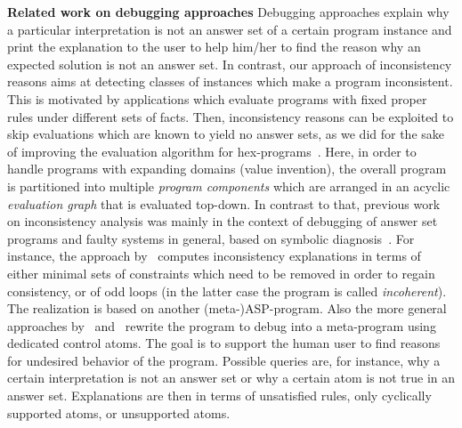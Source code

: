 \documentclass[11pt,fleqn,twoside]{article}
\newcommand{\leanparagraph}[1]{\smallskip\noindent\textbf{#1}}
\newcommand\hex{{\sc hex}\xspace}
\begin{document}
		\leanparagraph{Related work on debugging approaches}
		Debugging approaches explain why a particular interpretation is not an answer set of a certain program instance
		and print the explanation to the user to help him/her to find the reason why an expected solution is not an answer set.
		In contrast, our approach of inconsistency reasons aims at detecting classes of instances which make a program inconsistent.
		This is motivated by applications which evaluate programs with fixed proper rules
		under different sets of facts. Then, inconsistency reasons can be exploited to skip evaluations which are known to yield no answer sets,
		as we did for the sake of improving the evaluation algorithm for \hex-programs~\cite{efikrs2016-tplp}.
		Here, in order to handle programs with expanding domains (value invention),
		the overall program is partitioned into multiple \emph{program components} which are arranged in an acyclic \emph{evaluation graph} that is evaluated top-down.
		In contrast to that, previous work on inconsistency analysis was mainly in the context of
		debugging of answer set programs and faulty systems in general,
		based on symbolic diagnosis~\cite{reiter1987}.
		For instance, the approach by~ computes inconsistency explanations
		in terms of either minimal sets of constraints which need to be removed in order to regain consistency,
		or of odd loops (in the latter case the program is called \emph{incoherent}).
		The realization is based on another (meta-)ASP-program.
		Also the more general approaches by~ and~ rewrite the program to debug into a meta-program using dedicated control atoms.
		The goal is to support the human user to find reasons for undesired behavior of the program.
		Possible queries are, for instance, why a certain interpretation is not an answer set or why a certain atom is not true in an answer set.
		Explanations are then in terms of unsatisfied rules, only cyclically supported atoms, or unsupported atoms.
		
\end{document}
